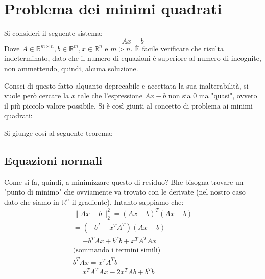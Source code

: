 \chapter{Problema dei minimi quadrati}
Si consideri il seguente sistema:
\[
    Ax = b    
\]
Dove $A\in \mathbb{R}^{m\times n},b\in \mathbb{R}^m, x\in \mathbb{R}^n$ e $m > n$. È facile verificare che risulta indeterminato, dato che il numero di equazioni è superiore al numero di incognite, non ammettendo, quindi, alcuna soluzione. 

Consci di questo fatto alquanto deprecabile e accettata la sua inalterabilità, si vuole però cercare la $x$ tale che l'espressione $Ax-b$ non sia $0$ ma "quasi", ovvero il più piccolo valore possibile. Si è così giunti al concetto di problema ai minimi quadrati:

Si giunge così al seguente teorema:

\section{Equazioni  normali}
Come si fa, quindi, a minimizzare questo di residuo? Bhe bisogna trovare un "punto di minimo" che ovviamente va trovato con le derivate (nel nostro caso dato che siamo in $\mathbb{R}^n$ il gradiente). Intanto sappiamo che:
\begin{align}
        \|Ax - b\|_2^2 = (Ax - b)^T (Ax - b) \\
        = \left( -b^T + x^T A^T \right) (Ax - b) \\
        = -b^T A x + b^T b + x^T A^T A x \\
        \text{(sommando i termini simili)} \\
        b^T A x = x^T A^T b \\
        = x^T A^T A x - 2 x^T A b + b^T b
\end{align}

